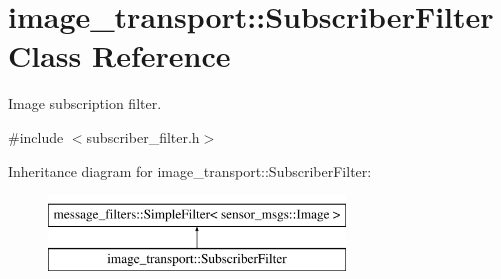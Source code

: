 \hypertarget{classimage__transport_1_1_subscriber_filter}{\section{image\-\_\-transport\-:\-:Subscriber\-Filter Class Reference}
\label{classimage__transport_1_1_subscriber_filter}
}


Image subscription filter.  




{\ttfamily \#include $<$subscriber\-\_\-filter.\-h$>$}

Inheritance diagram for image\-\_\-transport\-:\-:Subscriber\-Filter\-:\begin{figure}[H]
\begin{center}
\leavevmode
\includegraphics[height=2.000000cm]{classimage__transport_1_1_subscriber_filter}
\end{center}
\end{figure}
